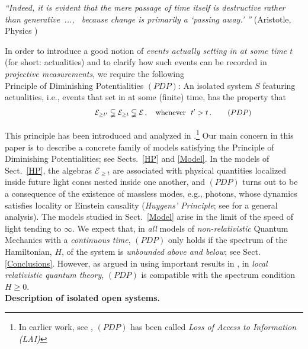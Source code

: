 \documentclass[12pt]{article}
\begin{document}
\hspace{0.5cm}\textit{``Indeed, it is evident that the mere passage of time itself is destructive rather than 
\mbox{generative ..., } because change is primarily a `passing away.' ''}  (Aristotle, Physics )

In order to introduce a good notion of \textit{events actually setting in at some time $t$} (for short: actualities) and to clarify 
how such events can be recorded in \textit{projective measurements}, we require the following \\

{Principle of Diminishing Potentialities} $(PDP)$: An isolated system $S$ featuring actualities, i.e., events that set in 
at some (finite) time, has the property that
\begin{equation}\label{PDP}
 \hspace{4.2cm}  \mathcal{E}_{\geq t'} \subsetneqq \mathcal{E}_{\geq t} \subsetneqq \mathcal{E}\,, \quad \text{whenever}\,\,\,\, t'>t\,. \qquad\, (PDP) \hspace{2.4cm} \square
 \end{equation}


This principle has been introduced and analyzed in \cite{F-Schub, BFS, Fr1, Fr2}.\footnote{In earlier work, see \cite{BFS}, $(PDP)$ has 
been called \textit{Loss of Access to Information (LAI)}} 
Our main concern in this paper is to describe a concrete family of models satisfying the Principle of Diminishing Potentialities; 
see Sects.~\ref{HP} and \ref{Model}. In the models of Sect.~\ref{HP}, the algebras $\mathcal{E}_{\geq t}$ are associated with 
physical quantities localized inside future light cones nested inside one another, and $(PDP)$ turns out to be a 
consequence of the existence of massless modes, e.g., photons, whose dynamics satisfies locality or Einstein 
causality (\textit{Huygens' Principle}; see \cite{Buchholz} for a general analysis).
The models studied in Sect.~\ref{Model} arise in the limit of the speed of light tending to $\infty$. We expect that, in 
\textit{all} models of \textit{non-relativistic} Quantum Mechanics with a \textit{continuous time}, $(PDP)$ only holds 
if the spectrum of the Hamiltonian, $H$, of the system is \textit{unbounded above and below}; see Sect. \ref{Conclusions}. 
However, as argued in \cite{Fr2} using important results in \cite{Buchholz}, in \textit{local relativistic quantum theory}, 
$(PDP)$ is compatible with the spectrum condition 
$H\geq 0$.\\

{\bf{Description of isolated open systems.}}\\
\end{document}
